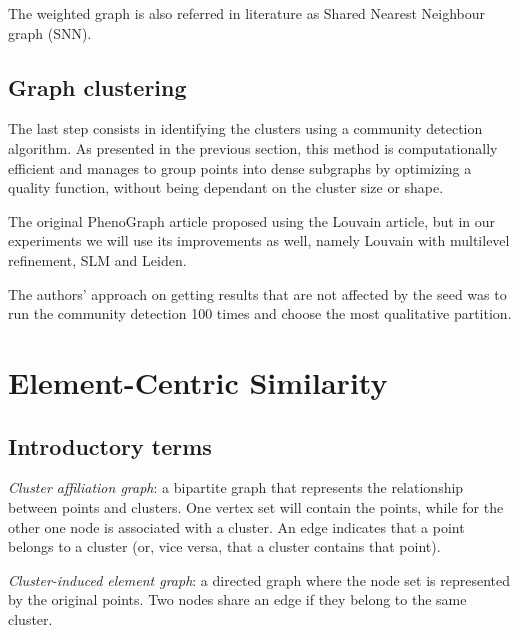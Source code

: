     The weighted graph is also referred in literature as Shared Nearest Neighbour graph (SNN).
    


    \subsection{Graph clustering}
    The last step consists in identifying the clusters using a community detection algorithm. As presented in the previous section, this method is computationally efficient and manages to group points into dense subgraphs by optimizing a quality function, without being dependant on the cluster size or shape.

    The original PhenoGraph article proposed using the Louvain article, but in our experiments we will use its improvements as well, namely Louvain with multilevel refinement, SLM and Leiden. 

    The authors' approach on getting results that are not affected by the seed was to run the community detection 100 times and choose the most qualitative partition.

\section{Element-Centric Similarity}
    \subsection{Introductory terms}
    \textit{Cluster affiliation graph}: a bipartite graph that represents the relationship between points and clusters. One vertex set will contain the points, while for the other one node is associated with a cluster. An edge indicates that a point belongs to a cluster (or, vice versa, that a cluster contains that point).
    
    \textit{Cluster-induced element graph}: a directed graph where the node set is represented by the original points. Two nodes share an edge if they belong to the same cluster.

